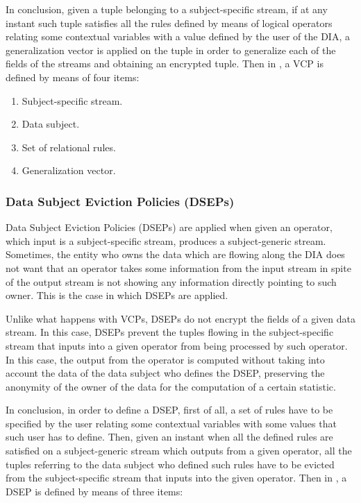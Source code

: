 In conclusion, given a tuple belonging to a subject-specific stream, if at any instant such tuple satisfies all the rules defined by means of logical operators relating some contextual variables with a value defined by the user of the DIA, a generalization vector is applied on the tuple in order to generalize each of the fields of the streams and obtaining an encrypted tuple. Then in \cite{privacypoliciesarticle}, a VCP is defined by means of four items:

\begin{enumerate}

\item Subject-specific stream.
\item Data subject.
\item Set of relational rules.
\item Generalization vector.

\end{enumerate}

\subsubsection{Data Subject Eviction Policies (DSEPs)}

Data Subject Eviction Policies (DSEPs) are applied when given an operator, which input is a subject-specific stream, produces a subject-generic stream. Sometimes, the entity who owns the data which are flowing along the DIA does not want that an operator takes some information from the input stream in spite of the output stream is not showing any information directly pointing to such owner. This is the case in which DSEPs are applied.

Unlike what happens with VCPs, DSEPs do not encrypt the fields of a given data stream. In this case, DSEPs prevent the tuples flowing in the subject-specific stream that inputs into a given operator from being processed by such operator. In this case, the output from the operator is computed without taking into account the data of the data subject who defines the DSEP, preserving the anonymity of the owner of the data for the computation of a certain statistic.

In conclusion, in order to define a DSEP, first of all, a set of rules have to be specified by the user relating some contextual variables with some values that such user has to define. Then, given an instant when all the defined rules are satisfied on a subject-generic stream which outputs from a given operator, all the tuples referring to the data subject who defined such rules have to be evicted from the subject-specific stream that inputs into the given operator. Then in \cite{privacypoliciesarticle}, a DSEP is defined by means of three items:

